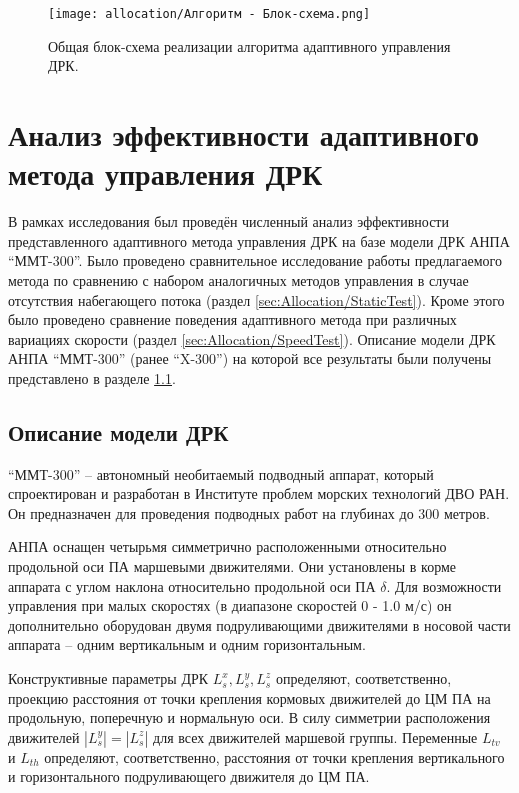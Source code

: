 
\begin{figure}[ht]
    \centering
    \texttt{[image: allocation/Алгоритм - Блок-схема.png]}
    \caption{Общая блок-схема реализации алгоритма адаптивного управления ДРК.}
    \label{fig:method_algorithm}
\end{figure}

\section{Анализ эффективности адаптивного метода управления ДРК}
В рамках исследования был проведён численный анализ эффективности представленного адаптивного метода управления ДРК на базе модели ДРК АНПА ``ММТ-300''\cite{борейко2019малогабаритный}.
Было проведено сравнительное исследование работы предлагаемого метода по сравнению с набором аналогичных методов управления в случае отсутствия набегающего потока (раздел \ref{sec:Allocation/StaticTest}).
Кроме этого было проведено сравнение поведения адаптивного метода при различных вариациях скорости (раздел \ref{sec:Allocation/SpeedTest}).
Описание модели ДРК АНПА ``ММТ-300'' (ранее ``X-300'') на которой все результаты были получены представлено в разделе \ref{ssec:Allocation/PropulsionDescription}.

\subsection{Описание модели ДРК}\label{ssec:Allocation/PropulsionDescription}
``ММТ-300'' -- автономный необитаемый подводный аппарат, который спроектирован и разработан в Институте проблем морских технологий ДВО РАН.
Он предназначен для проведения подводных работ на глубинах до 300 метров.

АНПА оснащен четырьмя симметрично расположенными относительно продольной оси ПА маршевыми движителями. 
Они установлены в корме аппарата с углом наклона относительно продольной оси ПА $\delta$.
Для возможности управления при малых скоростях (в диапазоне скоростей 0 - 1.0 м/с) он дополнительно оборудован двумя подруливающими движителями в носовой части аппарата -- одним вертикальным и одним горизонтальным.

Конструктивные параметры ДРК $L_s^x, L_s^y, L_s^z$ определяют, соответственно, проекцию расстояния от точки крепления кормовых движителей до ЦМ ПА на продольную, поперечную и нормальную оси.
В силу симметрии расположения движителей $|L_s^y| = |L_s^z|$ для всех движителей маршевой группы.
Переменные $L_{tv}$ и $L_{th}$ определяют, соответственно, расстояния от точки крепления вертикального и горизонтального подруливающего движителя до ЦМ ПА.

